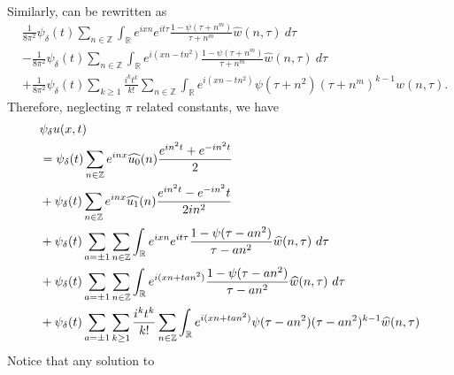 \documentclass[12pt,reqno]{amsart}
\numberwithin{equation}{section}  %
\renewcommand{\cref}{\Cref}
\newcommand{\rr}{\mathbb{R}}
\newcommand{\zz}{\mathbb{Z}}
\newcommand{\wh}{\widehat}
\begin{document}
%
Similarly, \cref{term-4} can be rewritten as
%
\begin{align}
		\label{main-int-expression''-2}
		& \frac{1}{8 \pi^2} \psi_{\delta}(t) \sum_{n\in \zz} \int_\rr e^{ixn}  
		e^{it \tau} \frac{ 1 - \psi(\tau +  n^m) 
		}{\tau +  n^m} \wh{w}(n, \tau) \ d \tau
		\\
		\label{main-int-expression''-3}
		&  - \frac{1}{8 \pi^2} \psi_{\delta}(t) \sum_{n\in \zz} \int_\rr e^{i(xn - 
		t n^2)}
		 \frac{1- \psi(\tau +  n^m)}{\tau +  n^m} \wh{w}(n, \tau) \ d \tau
		\\
		\label{main-int-expression''-4}
		& + \frac{1}{8 \pi^2} \psi_{\delta}(t) \sum_{k \ge 1} \frac{i^k t^k}{k!}
		\sum_{n \in \zz} \int_\rr e^{i(xn - t n^2 )}
		\psi(\tau +  n^2) (\tau +  n^m)^{k-1} \wh{w}(n, \tau).
\end{align}
%
%
Therefore, neglecting $\pi$ related constants, we have
%
%
\begin{align}
  & \psi_{\delta} u(x,t)
  \notag
  \\
  \label{main-rel-term-1}
  & = \psi_{\delta}(t) \sum_{n \in \zz} e^{inx} \wh{u_{0}}(n) \frac{e^{in^{2}t} + e^{-in^{2}t}}{2} 
  \\
  \label{main-rel-term-2}
  & + \psi_{\delta}(t) \sum_{n \in \zz} e^{inx}
  \wh{u_{1}}(n)\frac{e^{in^{2}t} - e^{-in^{2}}t}{2 i n^{2}} 
  \\
  \label{main-rel-term-3}
  & + \psi_{\delta}(t) \sum_{a = \pm 1} \sum_{n\in \zz} \int_\rr e^{ixn}  
  e^{it \tau} \frac{ 1 - \psi(\tau -  an^{2}) 
  }{\tau -  an^{2}} \wh{w}(n, \tau) \ d \tau
  \\
  \label{main-rel-term-4}
  & + \psi_{\delta}(t) \sum_{a = \pm 1} \sum_{n\in \zz} \int_\rr e^{i(xn + 
  t an^{2})}
  \frac{1- \psi(\tau -  an^{2})}{\tau -  an^{2}} \wh{w}(n, \tau) \ d \tau
  \\
  & + \psi_{\delta}(t) \sum_{a = \pm 1}  \sum_{k \ge 1} \frac{i^k t^k}{k!}
  \sum_{n \in \zz} \int_\rr e^{i(xn + t an^{2} )}
  \psi(\tau -  an^{2}) (\tau -  an^{2})^{k-1} \wh{w}(n, \tau)
  \\
  \label{main-rel-term-5}
\end{align}
Notice that any solution to 
%
\end{document}
